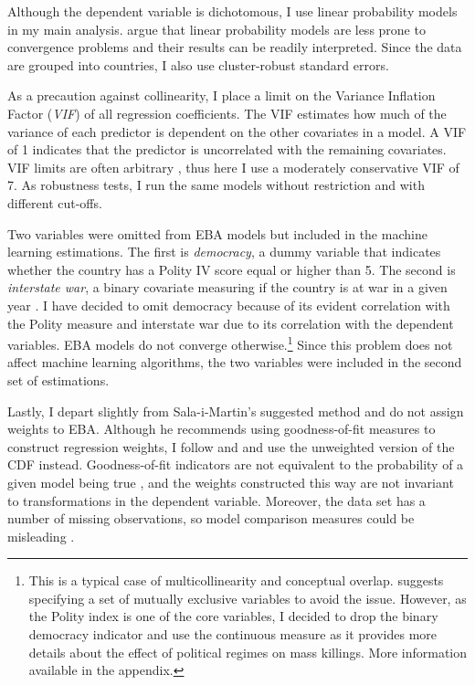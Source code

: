 \documentclass[a4paper,12pt]{article}
\begin{document}
Although the dependent variable is dichotomous, I use linear probability models in my main analysis. \citet[298]{gassebner2016expect} argue that linear probability models are less prone to convergence problems and their results can be readily interpreted. Since the data are grouped into countries, I also use cluster-robust standard errors.
	 
As a precaution against collinearity, I place a limit on the Variance Inflation Factor (\textit{VIF}) of all regression coefficients. The VIF estimates how much of the variance of each predictor is dependent on the other covariates in a model. A VIF of 1 indicates that the predictor is uncorrelated with the remaining covariates. VIF limits are often arbitrary \citep{bell2015examining,o2007caution}, thus here I use a moderately conservative VIF of 7. As robustness tests, I run the same models without restriction and with different cut-offs.
	
Two variables were omitted from EBA models but included in the machine learning estimations. The first is \textit{democracy}, a dummy variable that indicates whether the country has a Polity IV score equal or higher than 5. The second is \textit{interstate war}, a binary covariate measuring if the country is at war in a given year \citep{sarkees2010resort}. I have decided to omit democracy because of its evident correlation with the Polity measure and interstate war due to its correlation with the dependent variables. EBA models do not converge otherwise.\footnote{This is a typical case of multicollinearity and conceptual overlap. \citet{hlavac2016eba} suggests specifying a set of mutually exclusive variables to avoid the issue. However, as the Polity index is one of the core variables, I decided to drop the binary democracy indicator and use the continuous measure as it provides more details about the effect of political regimes on mass killings. More information available in the appendix.}  Since this problem does not affect machine learning algorithms, the two variables were included in the second set of estimations.
	
Lastly, I depart slightly from Sala-i-Martin's suggested method and do not assign weights to EBA. Although he recommends using goodness-of-fit measures to construct regression weights, I follow \citet{sturm2002robust} and \citet[299]{gassebner2016expect} and use the unweighted version of the CDF instead. Goodness-of-fit indicators are not equivalent to the probability of a given model being true \citep{anscombe1973graphs,king1986not}, and the weights constructed this way are not invariant to transformations in the dependent variable. Moreover, the data set has a number of missing observations, so model comparison measures could be misleading \citep{lall2016multiple}.
	
\end{document}
